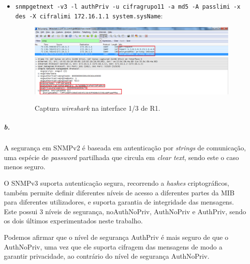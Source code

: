 \begin{itemize}
\item \texttt{snmpgetnext -v3 -l authPriv -u cifragrupo11 -a md5 -A passlimi -x des -X cifralimi 172.16.1.1 system.sysName}:

\begin{figure}[h]
\centering
\includegraphics[width=1\textwidth, height=0.3\textheight]{8a3.png}
\label{fig:16-capturaWireshark}
\caption{Captura \emph{wireshark} na interface \textsf{1/3} de \textsf{R1}.}
\end{figure}

\end{itemize}


\subparagraph{b.}
A segurança em SNMPv2 é baseada em autenticação por \emph{strings} de comunicação, uma espécie de \emph{password} partilhada que circula em \emph{clear text}, sendo este o caso menos seguro.

O SNMPv3 suporta autenticação segura, recorrendo a \emph{hashes} criptográficos, também permite definir diferentes níveis de acesso a diferentes partes da MIB para diferentes utilizadores, e suporta garantia de integridade das mensagens.
Este possui 3 níveis de segurança, \textsf{noAuthNoPriv}, \textsf{AuthNoPriv} e \textsf{AuthPriv}, sendo os dois últimos experimentados neste trabalho.

Podemos afirmar que o nível de segurança \textsf{AuthPriv} é mais seguro de que o \textsf{AuthNoPriv}, uma vez que ele suporta cifragem das mensagens de modo a garantir privacidade, ao contrário do nível de segurança \textsf{AuthNoPriv}.